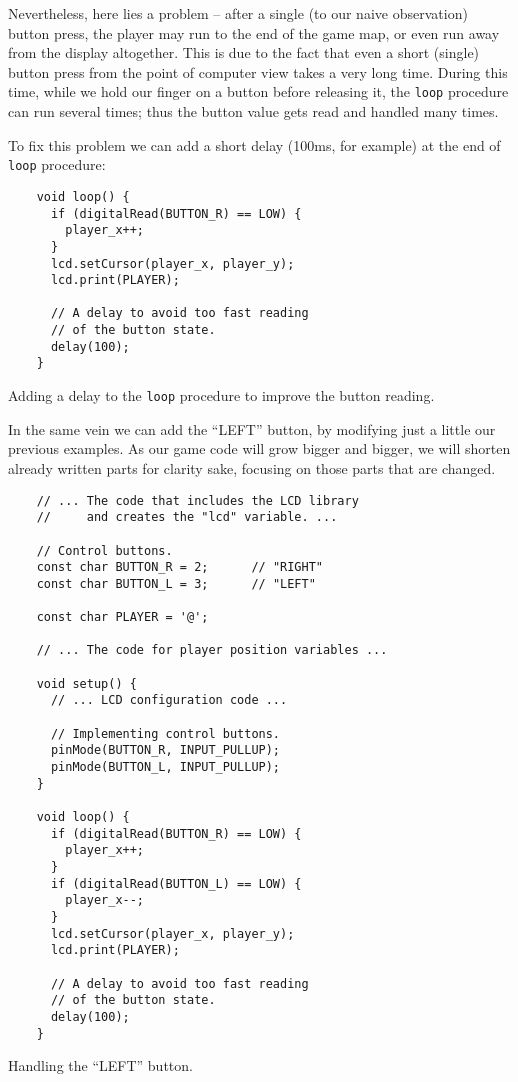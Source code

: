 \documentclass[../sparc.tex]{subfiles}
\begin{document}
Nevertheless, here lies a problem -- after a single (to our naive observation)
button press, the player may run to the end of the game map, or even run away
from the display altogether.  This is due to the fact that even a short (single)
button press from the point of computer view takes a very long time.  During
this time, while we hold our finger on a button before releasing it, the
\texttt{loop} procedure can run several times; thus the button value
gets read and handled many times.

To fix this problem we can add a short delay (100ms, for example) at the end of
\texttt{loop} procedure:

\begin{listing}[H]
  \begin{verbatim}
    void loop() {
      if (digitalRead(BUTTON_R) == LOW) {
        player_x++;
      }
      lcd.setCursor(player_x, player_y);
      lcd.print(PLAYER);

      // A delay to avoid too fast reading
      // of the button state.
      delay(100);
    }
  \end{verbatim}
  \caption{Adding a delay to the \texttt{loop} procedure to improve the
    button reading.}
  \label{listing:game-dev-button-delay}
\end{listing}

In the same vein we can add the ``LEFT'' button, by modifying just a little our
previous examples.  As our game code will grow bigger and bigger, we will
shorten already written parts for clarity sake, focusing on those parts that are
changed.

\begin{listing}[H]
  \begin{verbatim}
    // ... The code that includes the LCD library
    //     and creates the "lcd" variable. ...

    // Control buttons.
    const char BUTTON_R = 2;      // "RIGHT"
    const char BUTTON_L = 3;      // "LEFT"

    const char PLAYER = '@';

    // ... The code for player position variables ...

    void setup() {
      // ... LCD configuration code ...

      // Implementing control buttons.
      pinMode(BUTTON_R, INPUT_PULLUP);
      pinMode(BUTTON_L, INPUT_PULLUP);
    }

    void loop() {
      if (digitalRead(BUTTON_R) == LOW) {
        player_x++;
      }
      if (digitalRead(BUTTON_L) == LOW) {
        player_x--;
      }
      lcd.setCursor(player_x, player_y);
      lcd.print(PLAYER);

      // A delay to avoid too fast reading
      // of the button state.
      delay(100);
    }
  \end{verbatim}
  \caption{Handling the ``LEFT'' button.}
  \label{listing:game-dev-button-left}
\end{listing}
\end{document}
